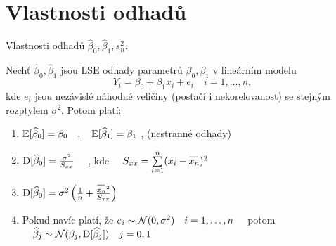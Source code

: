 \section{Vlastnosti odhadů}
Vlastnosti odhadů $ \widehat{\beta}_{0} , \widehat{\beta}_{1} ,  s_{n}^{2} $.
\begin{theorem}
   Nechť $ \widehat{\beta}_{0} , \widehat{\beta}_{1} $ jsou $ \mathrm{LSE} $ odhady parametrů $ \beta_{0}, \beta_{1} $ v lineárním modelu 
   $$
   		Y_{i} = \beta_{0} + \beta_{1} x_{i} + e_{i} \quad i = 1 , \dots , n ,
   $$
   kde $ e_{i} $ jsou nezávislé náhodné veličiny (postačí i nekorelovanost) se stejným rozptylem $ \sigma^{2} $. Potom platí:
   \begin{enumerate}
  \item $ \mathbb{E} [ \widehat{\beta}_{0} ] = \beta_{0} \quad , \quad \mathbb{E} [ \widehat{\beta}_{1} ] = \beta_{1} $ , (nestranné odhady)
  \item $  \mathrm{D} [ \widehat{\beta}_{0} ] = \frac{\sigma^{2}}{S_{xx}}  \quad $ , kde $ \quad S_{xx} = \sumin (x_{i} - \oxnn )^{2} $
  \item $ \D [ \widehat{\beta}_{0} ] = \sigma^{2} \left( \frac{1}{n} + \frac{\oxnn ^{2}}{S_{xx}} \right) $
  \item Pokud navíc platí, že $ e_{i} \sim \mathcal{N} ( 0 , \sigma^{2} ) \quad i = 1 , \dots , n \quad $ potom $ \quad \widehat{\beta}_{j} \sim \mathcal{N} ( \beta_{j} , \mathrm{D} [ \widehat{\beta}_{j} ] ) \quad j = 0 , 1  $ 
\end{enumerate}
\end{theorem}
